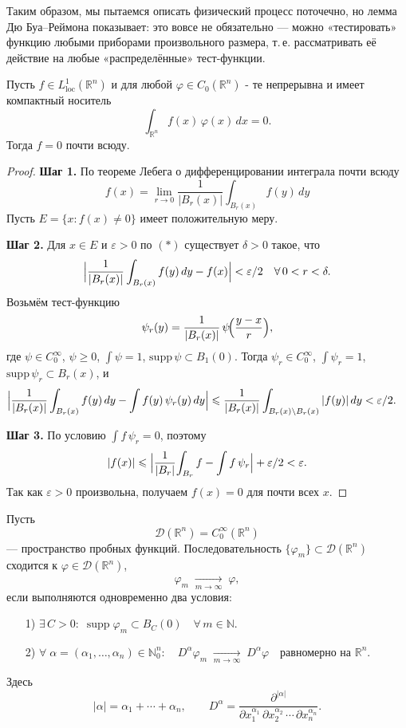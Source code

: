 Таким образом, мы пытаемся описать физический процесс поточечно, но лемма Дю Буа--Реймона показывает: это вовсе не обязательно --- можно «тестировать» функцию любыми приборами произвольного размера, т.\,е. рассматривать её действие на любые «распределённые» тест-функции.



\begin{lemma}
Пусть $f\in L^1_{\mathrm{loc}}(\mathbb R^n)$ и для любой $\varphi\in C_0(\mathbb R^n)$ - те непрерывна и имеет компактный носитель
\[
\int_{\mathbb R^n}f(x)\,\varphi(x)\,dx=0.
\]
Тогда $f=0$ почти всюду.
\end{lemma}

\begin{proof}
\textbf{Шаг 1.}
По теореме Лебега о дифференцировании интеграла почти всюду
\[
f(x)
=\lim_{r\to0}\frac1{|B_r(x)|}\int_{B_r(x)}f(y)\,dy
\tag{$*$}
\]
Пусть $E=\{x:f(x)\neq0\}$ имеет положительную меру.

\textbf{Шаг 2.}
Для $x\in E$ и $\varepsilon>0$ по $(*)$ существует $\delta>0$ такое, что
\[
\Bigl|\frac1{|B_r(x)|}\int_{B_r(x)}f(y)\,dy - f(x)\Bigr|<\varepsilon/2
\quad
\forall\,0<r<\delta.
\]
Возьмём тест-функцию
\[
\psi_r(y)
=\frac1{|B_r(x)|}\,\psi\!\Bigl(\frac{y-x}{r}\Bigr),
\]
где $\psi\in C_0^\infty$, $\psi\ge0$, $\int\psi=1$, $\mathrm{supp}\,\psi\subset B_1(0)$.
Тогда $\psi_r\in C_0^\infty$, $\int\psi_r=1$, $\mathrm{supp}\,\psi_r\subset B_r(x)$, и
\begin{align*}
\Bigl|\frac1{|B_r(x)|}\int_{B_r(x)}f(y)\,dy - \int f(y)\,\psi_r(y)\,dy\Bigr|
&\le
\frac1{|B_r(x)|}\int_{B_{r}(x)\setminus B_r(x)}|f(y)|\,dy
<\varepsilon/2.
\end{align*}

\textbf{Шаг 3.}
По условию $\int f\,\psi_r=0$, поэтому
\[
|f(x)| \le \Bigl|\frac1{|B_r|}\!\int_{B_r}f - \int f\,\psi_r\Bigr| + \varepsilon/2
<\varepsilon.
\]
Так как $\varepsilon>0$ произвольна, получаем $f(x)=0$ для почти всех $x$.
\end{proof}

\begin{definition}
Пусть
\[
\mathcal{D}(\mathbb{R}^n)=C_0^\infty(\mathbb{R}^n)
\]
— пространство пробных функций. Последовательность
\(\{\varphi_m\}\subset\mathcal{D}(\mathbb{R}^n)\)
сходится к \(\varphi\in\mathcal{D}(\mathbb{R}^n)\),
\[
\varphi_m\;\xrightarrow[m\to\infty]{}\;\varphi,
\]
если выполняются одновременно два условия:
\begin{enumerate}
  \item[1)] \(\displaystyle\exists\,C>0:\;
    \operatorname{supp}\varphi_m\subset B_C(0)\quad\forall\,m\in\mathbb{N}.\)
  \item[2)] \(\displaystyle\forall\;\alpha=(\alpha_1,\dots,\alpha_n)\in\mathbb{N}_0^n:\quad
    D^\alpha\varphi_m\;\xrightarrow[m\to\infty]{}\;D^\alpha\varphi
    \quad\text{равномерно на }\mathbb{R}^n.\)
\end{enumerate}
Здесь
\[
|\alpha|=\alpha_1+\cdots+\alpha_n,
\qquad
D^\alpha
=\frac{\partial^{|\alpha|}}{\partial x_1^{\alpha_1}\,\partial x_2^{\alpha_2}\,\cdots\,\partial x_n^{\alpha_n}}.
\]
\end{definition}

